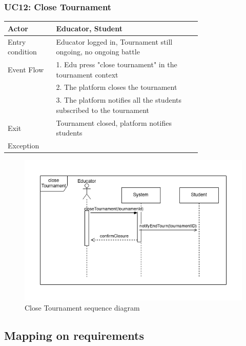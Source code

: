 \subsubsection{UC12: Close Tournament}
\begin{center}
    \begin{longtable}{lp{0.75\linewidth}}
        \hline
            Actor & Educator, Student\\
        \hline
            Entry condition & Educator logged in, Tournament still ongoing, no ongoing battle\\
        \hline
            Event Flow & 1. Edu press "close tournament" in the tournament context\\
& 2. The platform closes the tournament\\
& 3. The platform notifies all the students subscribed to the tournament\\
        \hline
            Exit & Tournament closed, platform notifies students\\
        \hline
            Exception & \\
        \hline
    \end{longtable}
\end{center}

\begin{figure}[H]
    \centering
    \includegraphics[width=1\linewidth]{misc//Images//UC Diagrams/UC12.png}
    \caption{Close Tournament sequence diagram}
    \label{fig:enter-label}
\end{figure}


\newpage
\subsection{Mapping on requirements}

